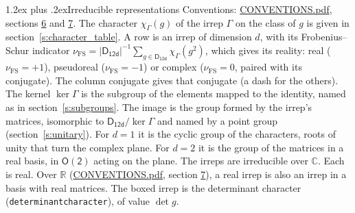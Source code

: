 \documentclass[10pt,a4paper]{article}
\makeatletter
\renewcommand\section{\@startsection{section}{1}{\z@}{-3ex plus -1ex minus -.2ex}%
  {1.2ex plus .2ex}{\normalfont\large\sffamily\bfseries\color{parttitle}}}
\numberwithin{equation}{section}
\newcommand{\grp}[1]{\mathsf{#1}}
\newcommand{\irchar}[1]{\chi_{#1}}
\newcommand{\fsind}{\nu_{\mathrm{FS}}}
\makeatother
\begin{document}
\section{Irreducible representations}\label{s:irreps}
Conventions: \href{../../CONVENTIONS.pdf}{CONVENTIONS.pdf}, sections \href{../../CONVENTIONS.pdf\#conv.6}{6} and \href{../../CONVENTIONS.pdf\#conv.7}{7}.
\leavevmode\label{n:function.character}\label{n:irrep.Gamma}The character $\irchar{\Gamma}(g)$ of the irrep $\Gamma$ on the class of $g$ is given in section~\ref{s:character_table}.
\leavevmode\label{n:index.dimension}\label{n:index.frobenius}\label{n:head.irrep}\label{n:head.reality}A row is an irrep of dimension $d$, with its Frobenius--Schur indicator $\fsind = |\grp{D_{12d}}|^{-1}\allowbreak\sum_{g\in\grp{D_{12d}}}\irchar{\Gamma}(g^2)$, which gives its reality: real ($\fsind = +1$), pseudoreal ($\fsind = -1$) or complex ($\fsind = 0$, paired with its conjugate). \label{n:head.conjugate}The column conjugate gives that conjugate (a dash for the others). \label{n:head.kernel}The kernel $\ker\Gamma$ is the subgroup of the elements mapped to the identity, named as in section~\ref{s:subgroups}. \label{n:head.image}The image is the group formed by the irrep's matrices, isomorphic to $\grp{D_{12d}}/\ker\Gamma$ and named by a point group (section~\ref{s:unitary}). For $d = 1$ it is the cyclic group of the characters, roots of unity that turn the complex plane. For $d = 2$ it is the group of the matrices in a real basis, in $\grp{O(2)}$ acting on the plane. The irreps are irreducible over $\mathbb{C}$. Each is real. Over $\mathbb{R}$ (\href{../../CONVENTIONS.pdf}{CONVENTIONS.pdf}, section \href{../../CONVENTIONS.pdf\#conv.7}{7}), a real irrep is also an irrep in a basis with real matrices. \label{n:mark.determinant}The boxed irrep is the determinant character (\texttt{determinantcharacter}), of value $\det g$.
\setlength{\emergencystretch}{2em}\par\setlength{\emergencystretch}{0pt}
\end{document}
